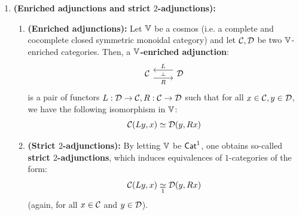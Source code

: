                 \begin{remark} \label{remark: objects_and_morphisms_of_grothendieck_constructions}
                    
                \end{remark}
                
                \begin{remark} \label{remark: 2_adjunctions}
                    \noindent
                    \begin{enumerate}
                        \item \textbf{(Enriched adjunctions and strict $2$-adjunctions):} 
                            \begin{enumerate}
                                \item \textbf{(Enriched adjunctions):} Let $\mathbb{V}$ be a cosmos (i.e. a complete and cocomplete closed symmetric monoidal category) and let $\mathcal{C}, \mathcal{D}$ be two $\mathbb{V}$-enriched categories. Then, a \textbf{$\mathbb{V}$-enriched adjunction}:
                                    $$
                                        \begin{tikzcd}
                                        	\C & \D
                                        	\arrow[""{name=0, anchor=center, inner sep=0}, "R"', shift right=2, from=1-1, to=1-2]
                                        	\arrow[""{name=1, anchor=center, inner sep=0}, "L"', shift right=2, from=1-2, to=1-1]
                                        	\arrow["\dashv"{anchor=center, rotate=-90}, draw=none, from=1, to=0]
                                        \end{tikzcd}
                                    $$
                                is a pair of functors $L: \mathcal{D} \to \mathcal{C}, R: \mathcal{C} \to \mathcal{D}$ such that for all $x \in \mathcal{C}, y \in \mathcal{D}$, we have the following isomorphism in $\mathbb{V}$:
                                    $$\mathcal{C}(Ly, x) \simeq \mathcal{D}(y, Rx)$$
                                \item \textbf{(Strict $2$-adjunctions):} By letting $\mathbb{V}$ be $\mathsf{Cat}^1$, one obtains so-called \textbf{strict $2$-adjunctions}, which induces equivalences of $1$-categories of the form:
                                    $$\mathcal{C}(Ly, x) \underset{1}{\simeq} \mathcal{D}(y, Rx)$$
                                (again, for all $x \in \mathcal{C}$ and $y \in \mathcal{D}$).
                            \end{enumerate}

\end{enumerate}
\end{remark}
